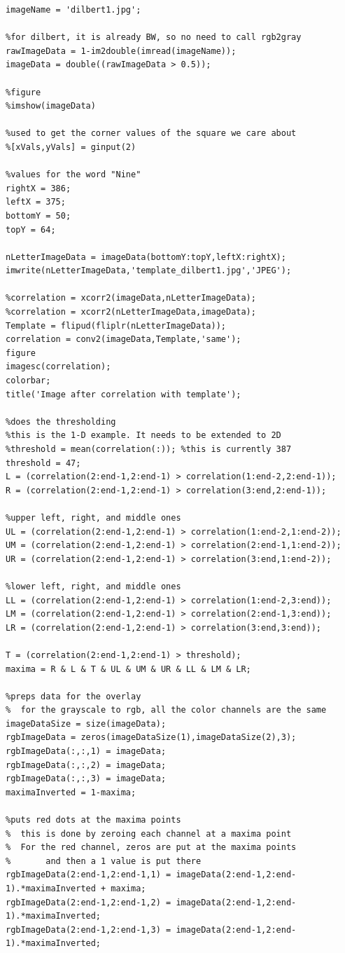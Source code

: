 \documentclass[11pt,psfig]{article}
\begin{document}
\begin{verbatim}
imageName = 'dilbert1.jpg';

%for dilbert, it is already BW, so no need to call rgb2gray
rawImageData = 1-im2double(imread(imageName));
imageData = double((rawImageData > 0.5));

%figure
%imshow(imageData)

%used to get the corner values of the square we care about 
%[xVals,yVals] = ginput(2)

%values for the word "Nine"
rightX = 386;
leftX = 375;
bottomY = 50;
topY = 64;

nLetterImageData = imageData(bottomY:topY,leftX:rightX);
imwrite(nLetterImageData,'template_dilbert1.jpg','JPEG');

%correlation = xcorr2(imageData,nLetterImageData);
%correlation = xcorr2(nLetterImageData,imageData);
Template = flipud(fliplr(nLetterImageData));
correlation = conv2(imageData,Template,'same');
figure
imagesc(correlation);
colorbar;
title('Image after correlation with template');

%does the thresholding
%this is the 1-D example. It needs to be extended to 2D
%threshold = mean(correlation(:)); %this is currently 387
threshold = 47;
L = (correlation(2:end-1,2:end-1) > correlation(1:end-2,2:end-1));
R = (correlation(2:end-1,2:end-1) > correlation(3:end,2:end-1));

%upper left, right, and middle ones
UL = (correlation(2:end-1,2:end-1) > correlation(1:end-2,1:end-2));
UM = (correlation(2:end-1,2:end-1) > correlation(2:end-1,1:end-2));
UR = (correlation(2:end-1,2:end-1) > correlation(3:end,1:end-2));

%lower left, right, and middle ones
LL = (correlation(2:end-1,2:end-1) > correlation(1:end-2,3:end));
LM = (correlation(2:end-1,2:end-1) > correlation(2:end-1,3:end));
LR = (correlation(2:end-1,2:end-1) > correlation(3:end,3:end));

T = (correlation(2:end-1,2:end-1) > threshold);
maxima = R & L & T & UL & UM & UR & LL & LM & LR;

%preps data for the overlay
%  for the grayscale to rgb, all the color channels are the same
imageDataSize = size(imageData);
rgbImageData = zeros(imageDataSize(1),imageDataSize(2),3);
rgbImageData(:,:,1) = imageData;
rgbImageData(:,:,2) = imageData;
rgbImageData(:,:,3) = imageData;
maximaInverted = 1-maxima;

%puts red dots at the maxima points
%  this is done by zeroing each channel at a maxima point
%  For the red channel, zeros are put at the maxima points 
%       and then a 1 value is put there
rgbImageData(2:end-1,2:end-1,1) = imageData(2:end-1,2:end-1).*maximaInverted + maxima;
rgbImageData(2:end-1,2:end-1,2) = imageData(2:end-1,2:end-1).*maximaInverted;
rgbImageData(2:end-1,2:end-1,3) = imageData(2:end-1,2:end-1).*maximaInverted;


\end{verbatim}
\end{document}
